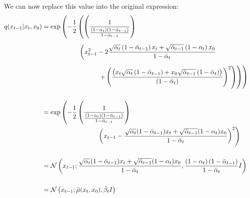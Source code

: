 \documentclass[twoside]{article}
\numberwithin{equation}{section}
\numberwithin{figure}{section}
\begin{document}
We can now replace this value into the original expression:
\begin{align}
  q(x_{t-1} | x_t, x_0) &= \exp \left(- \frac{1}{2} \left( \left(\frac{1}{\frac{\left(1 - \alpha_t\right)\left(1 - \bar{\alpha}_{t-1}\right)}{1 - \bar{\alpha}_{t-1}}}\right) \right. \right. \\[5pt]
  & \hspace{2cm} \left(x_{t-1}^2 -2 \frac{\sqrt{\alpha_t} \left(1 - \bar{\alpha}_{t-1}\right) x_t + \sqrt{\bar{\alpha}_{t-1}}\left(1 - \alpha_t\right) x_0}{1 - \bar{\alpha}_t} \right. \notag \\[5pt]
  & \hspace{3cm} \left. \left. \left. + \left(\frac{\left( x_t \sqrt{\alpha_t} \left( 1 - \bar{\alpha}_{t-1} \right) + x_0 \sqrt{\bar{\alpha}_{t-1}} \left( 1 - \bar{\alpha}_t \right) \right)}{\left(1 - \bar{\alpha}_{t}\right)} \right)^2 \right) \right) \right) \\[15pt]
  &= \exp \left(- \frac{1}{2} \left(\frac{1}{\frac{\left(1 - \alpha_t\right)\left(1 - \bar{\alpha}_{t-1}\right)}{1 - \bar{\alpha}_{t-1}}}\right) \right. \\
  & \hspace{3cm} \left. \left( x_{t-1} - \frac{\sqrt{\alpha_t}(1 - \bar{\alpha}_{t-1}) x_t + \sqrt{\bar{\alpha}_{t-1}}(1 - \alpha_t) x_0}{1 - \bar{\alpha}_t} \right)^2  \right) \notag \\[15pt]
  &= \mathcal{N} \left(x_{t-1}; \frac{\sqrt{\alpha_t}(1 - \bar{\alpha}_{t-1}) x_t + \sqrt{\bar{\alpha}_{t-1}}(1 - \alpha_t) x_0}{1 - \bar{\alpha}_t} , \frac{\left(1 - \alpha_t\right)\left(1 - \bar{\alpha}_{t-1}\right)}{1 - \bar{\alpha}_{t}} I \right) \\[15pt]
  &= \mathcal{N} \left(x_{t-1}; \tilde{\mu}(x_t, x_0), \tilde{\beta}_t I \right)
\end{align}
\end{document}
